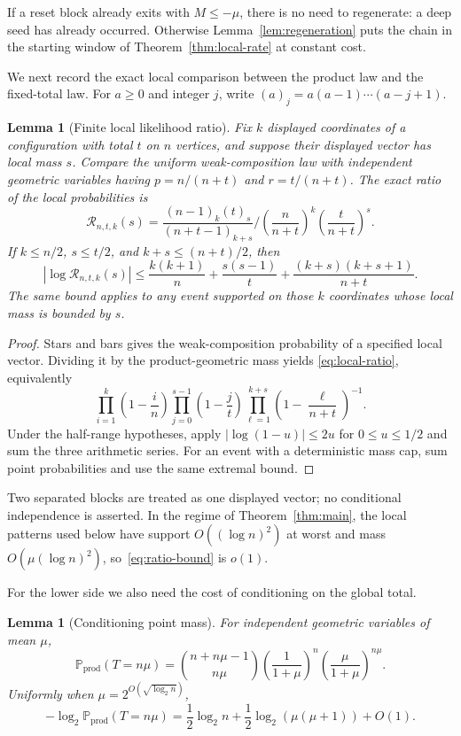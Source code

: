 \documentclass[11pt]{article}
\newtheorem{lemma}[theorem]{Lemma}
\newcommand{\Prob}{\mathbb P}
\newcommand{\prodprob}{\mathrm{prod}}
\begin{document}
If a reset block already exits with $M\le-\mu$, there is no need to regenerate:
a deep seed has already occurred.  Otherwise Lemma~\ref{lem:regeneration}
puts the chain in the starting window of Theorem~\ref{thm:local-rate} at
constant cost.

We next record the exact local comparison between the product law and the
fixed-total law.  For $a\ge0$ and integer $j$, write
$(a)_j=a(a-1)\cdots(a-j+1)$.

\begin{lemma}[Finite local likelihood ratio]\label{lem:likelihood-ratio}
Fix $k$ displayed coordinates of a configuration with total $t$ on $n$
vertices, and suppose their displayed vector has local mass $s$.  Compare the
uniform weak-composition law with independent geometric variables having
$p=n/(n+t)$ and $r=t/(n+t)$.  The exact ratio of the local probabilities is
\[
 \mathcal R_{n,t,k}(s)
 =\frac{(n-1)_k(t)_s}{(n+t-1)_{k+s}}
   \bigg/
   \left(\frac n{n+t}\right)^k
   \left(\frac t{n+t}\right)^s.
 \tag{6.4}\label{eq:local-ratio}
\]
If $k\le n/2$, $s\le t/2$, and $k+s\le(n+t)/2$, then
\[
 |\log\mathcal R_{n,t,k}(s)|
 \le \frac{k(k+1)}n+\frac{s(s-1)}t
      +\frac{(k+s)(k+s+1)}{n+t}.
 \tag{6.5}\label{eq:ratio-bound}
\]
The same bound applies to any event supported on those $k$ coordinates whose
local mass is bounded by $s$.
\end{lemma}

\begin{proof}
Stars and bars gives the weak-composition probability of a specified local
vector.  Dividing it by the product-geometric mass yields
\eqref{eq:local-ratio}, equivalently
\[
 \prod_{i=1}^k\left(1-\frac in\right)
 \prod_{j=0}^{s-1}\left(1-\frac jt\right)
 \prod_{\ell=1}^{k+s}\left(1-\frac\ell{n+t}\right)^{-1}.
\]
Under the half-range hypotheses, apply
$|\log(1-u)|\le2u$ for $0\le u\le1/2$ and sum the three arithmetic series.
For an event with a deterministic mass cap, sum point probabilities and use
the same extremal bound.
\end{proof}

Two separated blocks are treated as one displayed vector; no conditional
independence is asserted.  In the regime of Theorem~\ref{thm:main}, the local
patterns used below have support $O((\log n)^2)$ at worst and mass
$O(\mu(\log n)^2)$, so~\eqref{eq:ratio-bound} is $o(1)$.

For the lower side we also need the cost of conditioning on the global total.

\begin{lemma}[Conditioning point mass]\label{lem:conditioning-mass}
For independent geometric variables of mean $\mu$,
\[
 \Prob_{\prodprob}(T=n\mu)
 =\binom{n+n\mu-1}{n\mu}
   \left(\frac1{1+\mu}\right)^n
   \left(\frac\mu{1+\mu}\right)^{n\mu}.
 \tag{6.6}\label{eq:negative-binomial}
\]
Uniformly when $\mu=2^{O(\sqrt{\log_2 n})}$,
\[
 -\log_2\Prob_{\prodprob}(T=n\mu)
 =\frac12\log_2n+\frac12\log_2(\mu(\mu+1))+O(1).
 \tag{6.7}\label{eq:conditioning-cost}
\]
\end{lemma}
\end{document}
